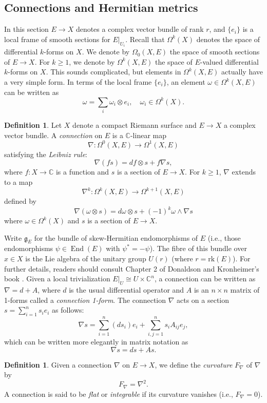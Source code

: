 \documentclass[10pt]{amsart}
\numberwithin{equation}{section}
\newcommand{\C}{\mathbb{C}}
\newcommand{\rk}{\mathrm{rk}}
\DeclareMathOperator{\End}{End}
\renewcommand{\frak}[1]{\mathfrak{#1}}
\theoremstyle{plain}
\theoremstyle{definition}
\newtheorem{defn}[thm]{Definition}
\theoremstyle{remark}
\begin{document}
\subsection{Connections and Hermitian metrics}
In this section $E \to X$ denotes a complex vector bundle of rank $r$, and $\{e_i\}$ is a local frame of smooth sections for $E|_{U_i}$. Recall that $\Omega^k(X)$ denotes the space of differential $k$-forms on $X$. We denote by $\Omega_0(X, E)$ the space of smooth sections of $E \to X$. For $k \ge 1$, we denote by $\Omega^k(X, E)$ the space of $E$-valued differential $k$-forms on $X$. This sounds complicated, but elements in $\Omega^k(X, E)$ actually have a very simple form. In terms of the local frame $\{e_i\}$, an element $\omega \in \Omega^k(X, E)$ can be written as
\[\omega = \sum_i \omega_i \otimes e_i, \quad \omega_i \in \Omega^k(X).\]
\begin{defn}
    Let $X$ denote a compact Riemann surface and $E \to X$ a complex vector bundle. A \emph{connection} on $E$ is a $\C$-linear map
    \[\nabla: \Omega^0(X, E) \to \Omega^1(X, E)\]
    satisfying the \emph{Leibniz rule}:
    \[\nabla(fs) = df \otimes s + f \nabla s,\]
    where $f: X \to \C$ is a function and $s$ is a section of $E \to X$. For $k \ge 1$, $\nabla$ extends to a map 
    \[\nabla^k: \Omega^k(X, E) \to \Omega^{k + 1}(X, E)\]
    defined by
    \[\nabla (\omega \otimes s) = d \omega \otimes s + (-1)^k \omega \wedge \nabla s \]
    where $\omega \in \Omega^k(X)$ and $s$ is a section of $E \to X$.
\end{defn}

Write $\frak{g}_E$ for the bundle of skew-Hermitian endomorphisms of $E$ (i.e., those endomorphisms $\psi \in \End(E)$ with $\psi^* = -\psi$). The fibre of this bundle over $x \in X$ is the Lie algebra of the unitary group $U(r)$ (where $r = \rk(E)$). For further details, readers should consult Chapter 2 of Donaldson and Kronheimer's book \cite{DK1990} . Given a local trivialization $E|_U \cong U \times \C^n$, a connection can be written as $\nabla = d + A$, where $d$ is the usual differential operator and $A$ is an $n \times n$ matrix of 1-forms called a \emph{connection 1-form}. The connection $\nabla$ acts on a section $s = \sum_{i = 1}^n s_i e_i$ as follows:
\[\nabla s = \sum_{i=1}^n (ds_i) e_i + \sum_{i, j = 1}^n s_i A_{ij} e_j,\]
which can be written more elegantly in matrix notation as
\[\nabla s = d s + A s.\]

\begin{defn}
    Given a connection $\nabla$ on $E \to X$, we define the \emph{curvature} $F_\nabla$ of $\nabla$ by 
    \[F_\nabla = \nabla^2.\]
    A connection is said to be \emph{flat} or \emph{integrable} if its curvature vanishes (i.e., $F_\nabla = 0$).
\end{defn}
\end{document}
